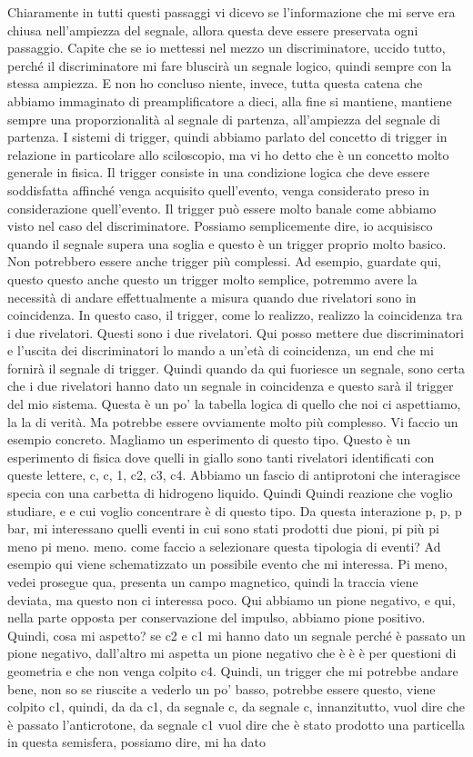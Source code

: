 Chiaramente in tutti questi passaggi vi dicevo se l'informazione che mi serve era chiusa nell'ampiezza del segnale, allora questa deve essere preservata ogni passaggio. Capite che se io mettessi nel mezzo un discriminatore, uccido tutto, perché il discriminatore mi fare bluscirà un segnale logico, quindi sempre con la stessa ampiezza. E non ho concluso niente, invece, tutta questa catena che abbiamo immaginato di preamplificatore a dieci, alla fine si mantiene, mantiene sempre una proporzionalità al segnale di partenza, all'ampiezza del segnale di partenza. I sistemi di trigger, quindi abbiamo parlato del concetto di trigger in relazione in particolare allo sciloscopio, ma vi ho detto che è un concetto molto generale in fisica. Il trigger consiste in una condizione logica che deve essere soddisfatta affinché venga acquisito quell'evento, venga considerato preso in considerazione quell'evento. Il trigger può essere molto banale come abbiamo visto nel caso del discriminatore. Possiamo semplicemente dire, io acquisisco quando il segnale supera una soglia e questo è un trigger proprio molto basico. Non potrebbero essere anche trigger più complessi. Ad esempio, guardate qui, questo questo anche questo un trigger molto semplice, potremmo avere la necessità di andare effettualmente a misura quando due rivelatori sono in coincidenza. In questo caso, il trigger, come lo realizzo, realizzo la coincidenza tra i due rivelatori. Questi sono i due rivelatori. Qui posso mettere due discriminatori e l'uscita dei discriminatori lo mando a un'età di coincidenza, un end che mi fornirà il segnale di trigger. Quindi quando da qui fuoriesce un segnale, sono certa che i due rivelatori hanno dato un segnale in coincidenza e questo sarà il trigger del mio sistema. Questa è un po' la tabella logica di quello che noi ci aspettiamo, la la di verità. Ma potrebbe essere ovviamente molto più complesso. Vi faccio un esempio concreto. Magliamo un esperimento di questo tipo. Questo è un esperimento di fisica dove quelli in giallo sono tanti rivelatori identificati con queste lettere, c, c, 1, c2, c3, c4. Abbiamo un fascio di antiprotoni che interagisce specia con una carbetta di hidrogeno liquido. Quindi Quindi reazione che voglio studiare, e e cui voglio concentrare è di questo tipo. Da questa interazione p, p, p bar, mi interessano quelli eventi in cui sono stati prodotti due pioni, pi più pi meno pi meno. meno. come faccio a selezionare questa tipologia di eventi? Ad esempio qui viene schematizzato un possibile evento che mi interessa. Pi meno, vedei prosegue qua, presenta un campo magnetico, quindi la traccia viene deviata, ma questo non ci interessa poco. Qui abbiamo un pione negativo, e qui, nella parte opposta per conservazione del impulso, abbiamo pione positivo. Quindi, cosa mi aspetto? se c2 e c1 mi hanno dato un segnale perché è passato un pione negativo, dall'altro mi aspetta un pione negativo che è è è per questioni di geometria e che non venga colpito c4. Quindi, un trigger che mi potrebbe andare bene, non so se riuscite a vederlo un po' basso, potrebbe essere questo, viene colpito c1, quindi, da da c1, da segnale c, da segnale c, innanzitutto, vuol dire che è passato l'anticrotone, da segnale c1 vuol dire che è stato prodotto una particella in questa semisfera, possiamo dire, mi ha dato 